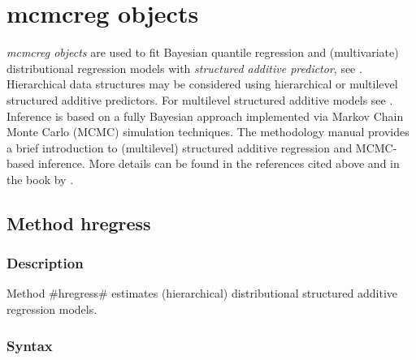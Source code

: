\chapter{mcmcreg objects}
\label{mcmcreg} 



{\em mcmcreg objects} are used to fit Bayesian quantile regression and (multivariate) distributional regression models with {\em
structured additive predictor}, see . Hierarchical data structures may be considered using
hierarchical or multilevel structured additive predictors. For multilevel structured additive models  see
. Inference is based on a fully Bayesian approach implemented via Markov Chain Monte Carlo (MCMC)
simulation techniques. The methodology manual provides a brief introduction to (multilevel) structured additive regression and MCMC-based
inference. More details can be found in the references cited above and in the book by .



\clearpage

\section{Method hregress}
\label{mcmcregress} 

\subsection{Description}
\label{mcmcregregressdescr}

Method #hregress# estimates (hierarchical) distributional structured additive regression models.

     

\subsection{Syntax}
\label{mcmcregregresssyntax}

